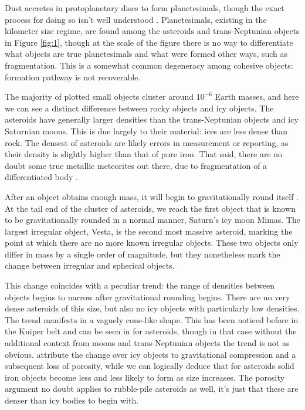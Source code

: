 \documentclass[twocolumn,linenumbers]{aastex631}
\begin{document}
Dust accretes in protoplanetary discs to form planetesimals, though the exact process for doing so isn't well understood \citep{Blum2008}. Planetesimals, existing in the kilometer size regime, are found among the asteroids and trans-Neptunian objects in Figure \ref{fig:1}, though at the scale of the figure there is no way to differentiate what objects are true planetesimals and what were formed other ways, such as fragmentation. This is a somewhat common degeneracy among cohesive objects: formation pathway is not recoverable. 

The majority of plotted small objects cluster around $10^{-6}$ Earth masses, and here we can see a distinct difference between rocky objects and icy objects. The asteroids have generally larger densities than the trans-Neptunian objects and icy Saturnian moons. This is due largely to their material: ices are less dense than rock. The densest of asteroids are likely errors in measurement or reporting, as their density is slightly higher than that of pure iron. That said, there are no doubt some true metallic meteorites out there, due to fragmentation of a differentiated body \citep{Scott2020}. 

After an object obtains enough mass, it will begin to gravitationally round itself \citep{Stern2002, Lineweaver2010}. At the tail end of the cluster of asteroids, we reach the first object that is known to be gravitationally rounded in a normal manner, Saturn's icy moon Mimas. The largest irregular object, Vesta, is the second most massive asteroid, marking the point at which there are no more known irregular objects. These two objects only differ in mass by a single order of magnitude, but they nonetheless mark the change between irregular and spherical objects.

This change coincides with a peculiar trend: the range of densities between objects begins to narrow after gravitational rounding begins. There are no very dense asteroids of this size, but also no icy objects with particularly low densities. The trend manifests in a vaguely cone-like shape. This has been noticed before in the Kuiper belt \citep{Bierson2019} and can be seen in \cite{Carry2012} for asteroids, though in that case without the additional context from moons and trans-Neptunian objects the trend is not as obvious. \cite{Bierson2019} attribute the change over icy objects to gravitational compression and a subsequent loss of porosity, while we can logically deduce that for asteroids solid iron objects become less and less likely to form as size increases. The porosity argument no doubt applies to rubble-pile asteroids as well, it's just that these are denser than icy bodies to begin with.
\end{document}
